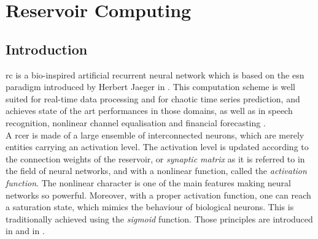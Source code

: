 \chapter{Reservoir Computing}

\section{Introduction}

\gls{rc} is a bio-inspired artificial recurrent neural network which is based on the \gls{esn} paradigm introduced by Herbert Jaeger in \cite{Jaeger2004}. This computation scheme is well suited for real-time data processing and for chaotic time series prediction\cite{Jaeger2004, JaegerH.2001Tesa, Lukoeviius2012}, and achieves state of the art performances in those domains, as well as in speech recognition\cite{Verstraeten2006, NIPS2010_4056, Jaeger2007}, nonlinear channel equalisation\cite{Jaeger2004} and financial forecasting \cite{financialTimeSeries}.\\

A \gls{rcer} is made of a large ensemble of interconnected neurons, which are merely entities carrying an activation level. The activation level  is updated according to the connection weights of the reservoir, or \emph{synaptic matrix} as it is referred to in the field of neural networks, and with a nonlinear function, called the \textit{activation function}. The nonlinear character is one of the main features making neural networks so powerful. Moreover, with a proper activation function, one can reach a saturation state, which mimics the behaviour of biological neurons. This is traditionally achieved using the \textit{sigmoid} function. Those principles are introduced in \cite[p.227-228]{bishop2006pattern} and in \cite[p.727-728]{russell2010artificial}.\\

